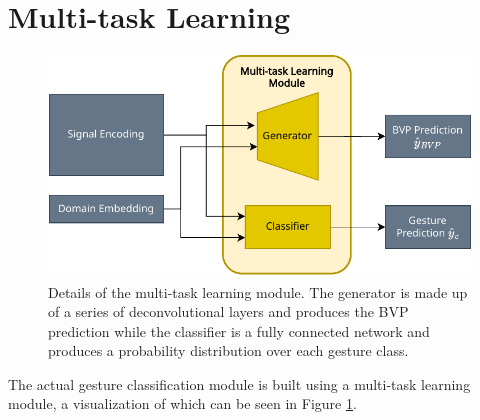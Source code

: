 \section{Multi-task Learning}\label{sec:methodology-multi-task-learning}

\begin{figure}
	\centering
	\includegraphics[width=0.8\linewidth]{figures/multitask_learning_module_diagram.pdf}
	\caption{Details of the multi-task learning module. The generator is made up of a series of deconvolutional layers and produces the BVP prediction while the classifier is a fully connected network and produces a probability distribution over each gesture class.}
	\label{fig:multitask-learning-module-diagram}
\end{figure}

The actual gesture classification module is built using a multi-task learning module, a visualization of which can be seen in Figure \ref{fig:multitask-learning-module-diagram}.

